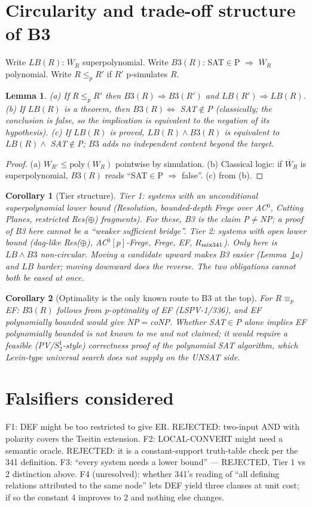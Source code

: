 \documentclass[11pt]{article}
\newtheorem{lemma}{Lemma}
\newtheorem{corollary}{Corollary}
\begin{document}
\section{Circularity and trade-off structure of B3}
Write $LB(R)$: $\overline W_R$ superpolynomial. Write $B3(R)$: SAT$\in$P $\Rightarrow$ $\overline W_R$ polynomial. Write $R\le_p R'$ if $R'$ p-simulates $R$.
\begin{lemma}\label{mono}
(a) If $R\le_p R'$ then $B3(R)\Rightarrow B3(R')$ and $LB(R')\Rightarrow LB(R)$.
(b) If $LB(R)$ is a theorem, then $B3(R)\iff$ SAT$\notin$P (classically; the conclusion is false, so the implication is equivalent to the negation of its hypothesis).
(c) If $LB(R)$ is proved, $LB(R)\wedge B3(R)$ is equivalent to $LB(R)\wedge$ SAT$\notin$P; $B3$ adds no independent content beyond the target.
\end{lemma}
\begin{proof}
(a) $W_{R'}\le \mathrm{poly}(W_R)$ pointwise by simulation. (b) Classical logic: if $\overline W_R$ is superpolynomial, $B3(R)$ reads ``SAT$\in$P $\Rightarrow$ false''. (c) from (b). \qedhere
\end{proof}
\begin{corollary}[Tier structure]\label{tier}
\emph{Tier 1}: systems with an unconditional superpolynomial lower bound (Resolution, bounded-depth Frege over AC$^0$, Cutting Planes, restricted Res($\oplus$) fragments). For these, B3 \emph{is} the claim P$\neq$NP; a proof of B3 here cannot be a ``weaker sufficient bridge''. \emph{Tier 2}: systems with open lower bound (dag-like Res($\oplus$), AC$^0[p]$-Frege, Frege, EF, $R_{\rm mix341}$). Only here is $LB\wedge B3$ non-circular. Moving a candidate upward makes B3 easier (Lemma~\ref{mono}a) and $LB$ harder; moving downward does the reverse. The two obligations cannot both be eased at once.
\end{corollary}
\begin{corollary}[Optimality is the only known route to B3 at the top]\label{opt}
For $R\equiv_p$ EF: $B3(R)$ follows from p-optimality of EF (LSPV-1/336), and EF polynomially bounded would give NP$=$coNP. Whether SAT$\in$P alone implies EF polynomially bounded is not known to me and not claimed; it would require a feasible (PV/$S^1_2$-style) correctness proof of the polynomial SAT algorithm, which Levin-type universal search does not supply on the UNSAT side.
\end{corollary}

\section{Falsifiers considered}
F1: DEF might be too restricted to give ER. REJECTED: two-input AND with polarity covers the Tseitin extension. F2: LOCAL-CONVERT might need a semantic oracle. REJECTED: it is a constant-support truth-table check per the 341 definition. F3: ``every system needs a lower bound'' --- REJECTED, Tier 1 vs 2 distinction above. F4 (unresolved): whether 341's reading of ``all defining relations attributed to the same node'' lets DEF yield three clauses at unit cost; if so the constant 4 improves to 2 and nothing else changes.
\end{document}
